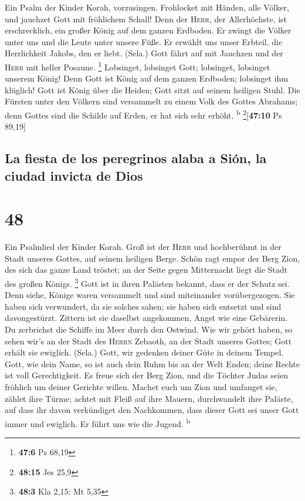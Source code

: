  Ein Psalm der Kinder Korah, vorzusingen. 
Frohlocket mit Händen, alle Völker, und jauchzet Gott mit fröhlichem
Schall!  Denn der \textsc{Herr}, der Allerhöchste, ist
erschrecklich, ein großer König auf dem ganzen Erdboden. 
Er zwingt die Völker unter uns und die Leute unter unsere Füße.
 Er erwählt uns unser Erbteil, die Herrlichkeit Jakobs,
den er liebt. (Sela.)  Gott fährt auf mit Jauchzen und der
\textsc{Herr} mit heller Posaune. \footnote{\textbf{47:6} Ps 68,19}
 Lobsinget, lobsinget Gott; lobsinget, lobsinget unserem
König!  Denn Gott ist König auf dem ganzen Erdboden;
lobsinget ihm klüglich!  Gott ist König über die Heiden;
Gott sitzt auf seinem heiligen Stuhl.  Die Fürsten unter
den Völkern sind versammelt zu einem Volk des Gottes Abrahams; denn
Gottes sind die Schilde auf Erden, er hat sich sehr erhöht.
\textsuperscript{b} \footnote{\textbf{48:15} Jes 25,9}{[}\textbf{47:10}
Ps 89,19{]}

\hypertarget{la-fiesta-de-los-peregrinos-alaba-a-siuxf3n-la-ciudad-invicta-de-dios}{%
\subsection{La fiesta de los peregrinos alaba a Sión, la ciudad invicta
de
Dios}\label{la-fiesta-de-los-peregrinos-alaba-a-siuxf3n-la-ciudad-invicta-de-dios}}

\hypertarget{section-47}{%
\section{48}\label{section-47}}

 Ein Psalmlied der Kinder Korah.  Groß ist
der \textsc{Herr} und hochberühmt in der Stadt unseres Gottes, auf
seinem heiligen Berge.  Schön ragt empor der Berg Zion,
des sich das ganze Land tröstet; an der Seite gegen Mitternacht liegt
die Stadt des großen Königs. \footnote{\textbf{48:3} Kla 2,15; Mt 5,35}
 Gott ist in ihren Palästen bekannt, dass er der Schutz
sei.  Denn siehe, Könige waren versammelt und sind
miteinander vorübergezogen.  Sie haben sich verwundert, da
sie solches sahen; sie haben sich entsetzt und sind davongestürzt.
 Zittern ist sie daselbst angekommen, Angst wie eine
Gebärerin.  Du zerbrichst die Schiffe im Meer durch den
Ostwind.  Wie wir gehört haben, so sehen wir's an der
Stadt des \textsc{Herrn} Zebaoth, an der Stadt unseres Gottes; Gott
erhält sie ewiglich. (Sela.)  Gott, wir gedenken deiner
Güte in deinem Tempel.  Gott, wie dein Name, so ist auch
dein Ruhm bis an der Welt Enden; deine Rechte ist voll Gerechtigkeit.
 Es freue sich der Berg Zion, und die Töchter Judas seien
fröhlich um deiner Gerichte willen.  Machet euch um Zion
und umfanget sie, zählet ihre Türme;  achtet mit Fleiß
auf ihre Mauern, durchwandelt ihre Paläste, auf dass ihr davon
verkündiget den Nachkommen,  dass dieser Gott sei unser
Gott immer und ewiglich. Er führt uns wie die Jugend.
\textsuperscript{b}

